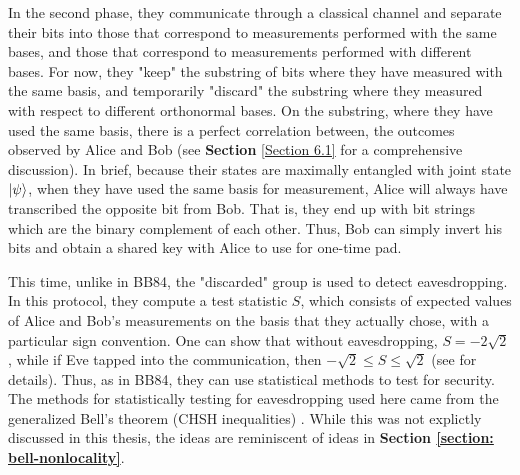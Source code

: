 In the second phase, they communicate through a classical channel and separate their bits into those that correspond to measurements performed with the same bases, and those that correspond to measurements performed with different bases.  For now, they "keep" the substring of bits where they have measured with the same basis, and temporarily "discard" the substring where they measured with respect to different orthonormal bases.  On the substring, where they have used the same basis, there is a perfect correlation between, the outcomes observed by Alice and Bob (see {\bf{Section}} \ref{Section 6.1} for a comprehensive discussion).  In brief, because their states are maximally entangled with joint state $\ket{\psi}$, when they have used the same basis for measurement, Alice will always have transcribed the opposite bit from Bob. That is, they end up with bit strings which are the binary complement of each other. Thus, Bob can simply invert his bits and obtain a shared key with Alice to use for one-time pad. 

This time, unlike in BB84, the "discarded" group is used to detect eavesdropping.  In this protocol, they compute a test statistic $S$, which consists of expected values of Alice and Bob's measurements on the basis that they actually chose, with a particular sign convention.  One can show that without eavesdropping, $S=-2\sqrt{2}$, while if Eve tapped into the communication, then $-\sqrt{2} \le S \le \sqrt{2}$ (see \cite{Ekert1991} for details).  Thus, as in BB84, they can use statistical methods to test for security.  The methods for statistically testing for eavesdropping used here came from the generalized Bell's theorem (CHSH inequalities) \cite{bell1964}.  While this was not explictly discussed in this thesis, the ideas are reminiscent of ideas in \textbf{Section \ref{section: bell-nonlocality}}.


